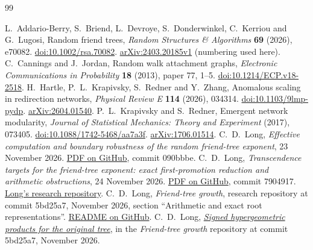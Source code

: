 \documentclass[11pt]{article}
\theoremstyle{remark}
\begin{document}
\begin{thebibliography}{99}
\raggedright
{} L.~Addario-Berry, S.~Briend, L.~Devroye, S.~Donderwinkel,
C.~Kerriou and G.~Lugosi, Random friend trees, \emph{Random Structures \& Algorithms} \textbf{69} (2026), e70082. \href{https://doi.org/10.1002/rsa.70082}{doi:10.1002/rsa.70082}.
\href{https://arxiv.org/abs/2403.20185v1}{arXiv:2403.20185v1} (numbering used here).
 C.~Cannings and J.~Jordan, Random walk attachment graphs,
\emph{Electronic Communications in Probability} \textbf{18} (2013),
paper 77, 1--5. \href{https://doi.org/10.1214/ECP.v18-2518}{doi:10.1214/ECP.v18-2518}.
 H.~Hartle, P.~L.~Krapivsky, S.~Redner and Y.~Zhang,
Anomalous scaling in redirection networks, \emph{Physical Review E}
\textbf{114} (2026), 034314.
\href{https://doi.org/10.1103/9lmp-pydp}{doi:10.1103/9lmp-pydp}. \href{https://arxiv.org/abs/2604.01540}{arXiv:2604.01540}.
 P.~L.~Krapivsky and S.~Redner, Emergent network modularity,
\emph{Journal of Statistical Mechanics: Theory and Experiment} (2017),
073405. \href{https://doi.org/10.1088/1742-5468/aa7a3f}{doi:10.1088/1742-5468/aa7a3f}. \href{https://arxiv.org/abs/1706.01514}{arXiv:1706.01514}.
 C.~D.~Long, \emph{Effective computation and boundary robustness of the random friend-tree exponent}, 23 November 2026. \href{https://github.com/long-mathematics/friend-tree-growth/blob/090bbbe5faec83ec4124bd427eb5fda32c79bef1/friend_tree_growth.pdf}{PDF on GitHub}, commit 090bbbe.
 C.~D.~Long, \emph{Transcendence targets for the friend-tree exponent: exact first-promotion reduction and arithmetic obstructions}, 24 November 2026. \href{https://github.com/long-mathematics/friend-tree-growth/blob/790491725d9cf445789e14c24c277532f5d2e5c7/friend_tree_transcendence_progress.pdf}{PDF on GitHub}, commit 7904917. \href{https://github.com/long-mathematics/friend-tree-growth}{Long's research repository}.
 C.~D.~Long, \emph{Friend-tree growth}, research repository at commit 5bd25a7, November 2026, section ``Arithmetic and exact root representations''. \href{https://github.com/long-mathematics/friend-tree-growth/blob/5bd25a7d506cb64a8444b86334ab531d295f6c78/README.md#arithmetic-and-exact-root-representations}{README on GitHub}.
 C.~D.~Long, \href{https://github.com/long-mathematics/friend-tree-growth/blob/5bd25a7d506cb64a8444b86334ab531d295f6c78/README.md#signed-hypergeometric-products-for-the-original-tree}{\emph{Signed hypergeometric products for the original tree}}, in the \emph{Friend-tree growth} repository at commit 5bd25a7, November 2026.

\end{thebibliography}
\end{document}
